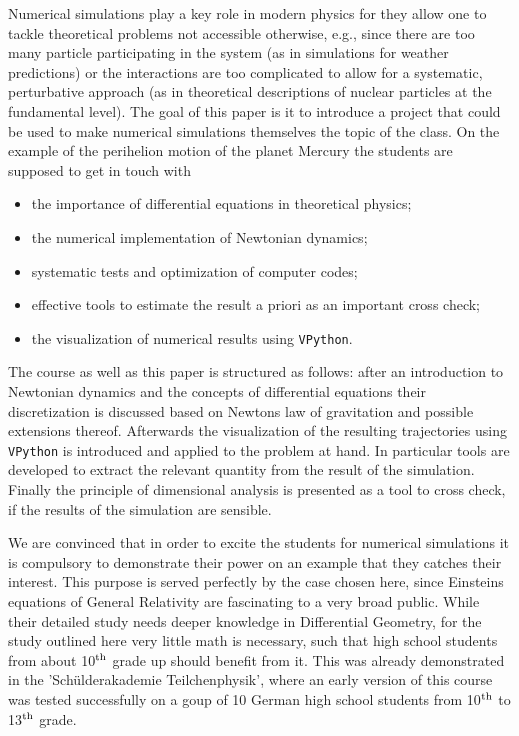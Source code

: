 \documentclass[12pt]{iopart}
\begin{document}
Numerical simulations play a key role in modern physics for they allow one to tackle theoretical problems
not accessible otherwise, e.g., since there are too many particle participating in the system (as in
simulations for weather predictions) or the interactions are too complicated to allow for a systematic,
perturbative approach (as in theoretical descriptions of nuclear particles at the fundamental level). 
 The goal of this paper is it to
introduce a project that could be used to make numerical simulations themselves the topic of the class.
On the example of the perihelion motion of the planet Mercury the students are supposed to get in touch with
\begin{itemize}
\item the importance of differential equations in theoretical physics;
\item the numerical implementation of Newtonian dynamics;
\item systematic tests and optimization of computer codes;
\item effective tools to estimate the result a priori as an important cross check;
\item the visualization of numerical results using \texttt{VPython}.
\end{itemize}
The course as well as this paper is structured as follows: after an introduction to Newtonian dynamics and the 
concepts of differential equations their discretization is discussed based on Newtons law of gravitation and possible
extensions thereof. Afterwards the visualization of the resulting trajectories using \texttt{VPython} is introduced and
applied to the problem at hand. In particular tools are developed to extract the relevant quantity from the result
of the simulation.
Finally the principle of dimensional analysis is presented as a tool to cross check, if the results of the simulation
are sensible.

We are convinced that in order to excite the students for numerical simulations it is compulsory to
demonstrate their power on an example that they catches their interest. This purpose is served 
perfectly by the case chosen here, since Einsteins equations of General Relativity are fascinating to
a very broad public. While their detailed study needs deeper knowledge in Differential Geometry, for
the study outlined here very little math is necessary, such that high school students from about 
10$^{\rm th}$ grade up should benefit from it. This was already demonstrated in the
'Sch\"ulderakademie Teilchenphysik', where an early version of this course was tested successfully 
on a goup of 10 German high school students from 10$^{\rm th}$ to 13$^{\rm th}$ grade.
\end{document}

